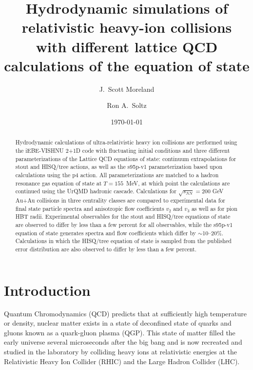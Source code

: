\documentclass[aps,prc,reprint,amsmath,nofootinbib,superscriptaddress]{revtex4-1}
\begin{document}
\title{Hydrodynamic simulations of relativistic heavy-ion collisions\\ with different lattice QCD calculations of the equation of state}

\author{J.\ Scott Moreland}
\author{Ron A.\ Soltz}

\date{\today}

\begin{abstract}
Hydrodynamic calculations of ultra-relativistic heavy ion collisions are performed using the iEBE-VISHNU 2+1D code with fluctuating initial conditions and three different parameterizations of the Lattice QCD equations of state: continuum extrapolations for stout and HISQ/tree actions, as well as the s95p-v1 parameterization based upon calculations using the p4 action.  All parameterizations are matched to a hadron resonance gas equation of state at $T= 155$~MeV, at which point the calculations are continued using the UrQMD hadronic cascade.  Calculations for $\sqrt{s_{NN}}=200$ GeV Au+Au collisions in three centrality classes are compared to experimental data for final state particle spectra and anisotropic flow coefficients $v_2$ and $v_3$ as well as for pion HBT radii.  Experimental observables for the stout and HISQ/tree equations of state are observed to differ by less than a few percent for all observables, while the s95p-v1 equation of state generates spectra and flow coefficients which differ by $\sim$10--20\%.  Calculations in which the HISQ/tree equation of state is sampled from the published error distribution are also observed to differ by less than a few percent.
\end{abstract}

\maketitle

\section{Introduction}

Quantum Chromodynamics (QCD) predicts that at sufficiently high temperature or density, nuclear matter exists in a state of deconfined state of quarks and gluons known as a quark-gluon plasma (QGP). 
This state of matter filled the early universe several microseconds after the big bang and is now recreated and studied in the laboratory by colliding heavy ions at relativistic energies at the Relativistic Heavy Ion Collider (RHIC) and the Large Hadron Collider (LHC).
\end{document}
